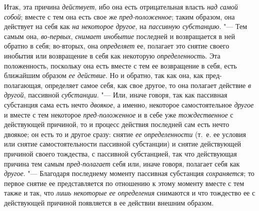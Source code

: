 Итак, эта причина {\em действует}, ибо она есть
отрицательная власть {\em над самой собой}; вместе с
тем она есть свое же {\em пред-положенное}; таким
образом, она действует на себя как {\em на некоторое
другое}, на {\em пассивную субстанцию}. "--- Тем самым
она, {\em во-первых}, {\em снимает
инобытие} последней и возвращается в ней обратно в себя; во-вторых, она
{\em определяет} ее, полагает это снятие своего
инобытия или возвращение в себя как некоторую
{\em определенность}. Эта положенность, поскольку она
есть вместе с тем ее возвращение в себя, есть ближайшим образом
{\em ее действие}. Но и обратно, так как она, как
пред-полагающая, определяет самое себя, как свое другое, то она полагает
действие {\em в другой}, пассивной
{\em субстанции}. "--- Или, иначе говоря, так как
пассивная субстанция сама есть нечто {\em двоякое}, а
именно, некоторое самостоятельное {\em другое} и вместе
с тем некоторое {\em пред-положенное} и в себе уже
{\em тождественное} с действующей причиной, то и
процесс действия последней сам есть нечто двоякое; он есть то и другое
сразу: снятие {\em ее определенности} (т.~е. ее условия
или снятие самостоятельности пассивной субстанции) и снятие действующей
причиной своего тождества, с пассивной субстанцией, так что действующая
причина тем самым {\em пред-полагает} себя или, иначе
говоря, полагает себя как {\em другое}. "--- Благодаря
последнему моменту пассивная субстанция
{\em сохраняется}; то первое снятие ее представляется
по отношению к этому моменту вместе с тем также и так, что
{\em лишь некоторые ее определения} снимаются и что
тождество ее с действующей причиной появляется в ее действии внешним
образом.

